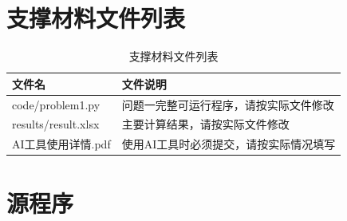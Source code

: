 \documentclass[UTF8,a4paper,12pt,fontset=fandol]{ctexart}
\begin{document}
\newpage
\begin{appendices}

\section{支撑材料文件列表}
\begin{table}[H]
  \centering
  \caption{支撑材料文件列表}
  \begin{tabularx}{\textwidth}{lX}
    \toprule
    文件名 & 文件说明 \\
    \midrule
    code/problem1.py & 问题一完整可运行程序，请按实际文件修改 \\
    results/result.xlsx & 主要计算结果，请按实际文件修改 \\
    AI工具使用详情.pdf & 使用AI工具时必须提交，请按实际情况填写 \\
    \bottomrule
  \end{tabularx}
\end{table}

\section{源程序}
% 

\end{appendices}
\end{document}
